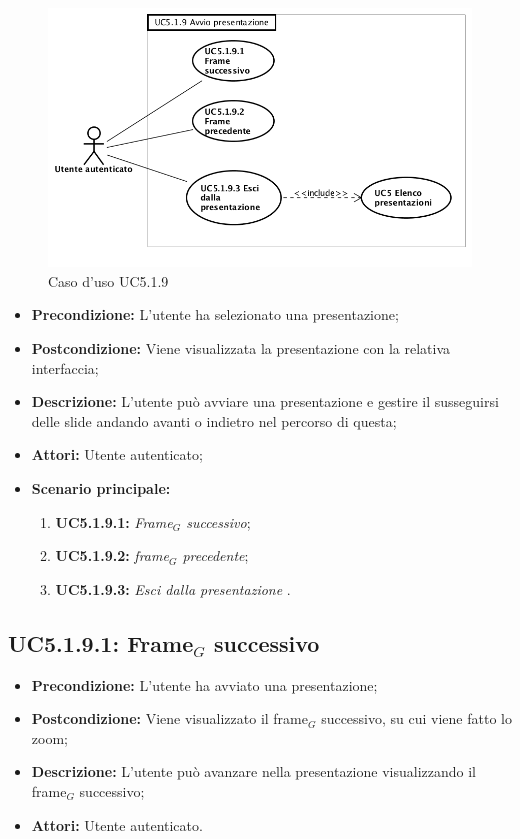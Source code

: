 \begin{figure}[h]
	\begin{center}
	\includegraphics[scale=0.4]{diagram/UC5-1-9.png}
	\caption{Caso d'uso UC5.1.9}
	\end{center}
\end{figure}
\begin{itemize}
	\item \textbf{Precondizione:} L'utente ha selezionato una presentazione;
	\item \textbf{Postcondizione:} Viene visualizzata la presentazione con la relativa interfaccia;
	\item \textbf{Descrizione:} L'utente può avviare una presentazione e gestire il susseguirsi delle slide andando avanti o indietro nel percorso di questa;
	\item \textbf{Attori:} Utente autenticato;
	\item \textbf{Scenario principale:}
	\begin{enumerate}
		\item \textbf{ UC5.1.9.1:} \textit{ Frame$_G$ successivo};
		\item \textbf{ UC5.1.9.2:} \textit{ frame$_G$ precedente};
		\item \textbf{ UC5.1.9.3:} \textit{ Esci dalla presentazione }.
	\end{enumerate}
\end{itemize}
\subsection{ UC5.1.9.1: Frame$_G$ successivo}

\begin{itemize}
	\item \textbf{Precondizione:} L'utente ha avviato una presentazione;
	\item \textbf{Postcondizione:} Viene visualizzato il frame$_G$ successivo, su cui viene fatto lo zoom;
	\item \textbf{Descrizione:} L'utente può avanzare nella presentazione visualizzando il frame$_G$ successivo;
	\item \textbf{Attori:} Utente autenticato.
\end{itemize}
